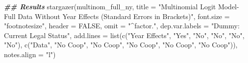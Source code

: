 \documentclass[a4paper,nobind]{templates/ociamthesis}
\newenvironment{Shaded}{\begin{snugshade}}{\end{snugshade}}
\newcommand{\AttributeTok}[1]{\textcolor[rgb]{0.77,0.63,0.00}{#1}}
\newcommand{\ConstantTok}[1]{\textcolor[rgb]{0.00,0.00,0.00}{#1}}
\newcommand{\DocumentationTok}[1]{\textcolor[rgb]{0.56,0.35,0.01}{\textbf{\textit{#1}}}}
\newcommand{\FunctionTok}[1]{\textcolor[rgb]{0.00,0.00,0.00}{#1}}
\newcommand{\NormalTok}[1]{#1}
\newcommand{\StringTok}[1]{\textcolor[rgb]{0.31,0.60,0.02}{#1}}
\renewenvironment{Shaded}
{
  \vspace{10pt}%
  \begin{snugshade}%
}{%
  \end{snugshade}%
  \vspace{8pt}%
}
\begin{document}
\begin{Shaded}
\begin{Highlighting}[]
\DocumentationTok{\#\# Results }
\FunctionTok{stargazer}\NormalTok{(multinom\_full\_ny, }\AttributeTok{title =} \StringTok{"Multinomial Logit Model{-} Full Data Without Year Effects (Standard Errors in Brackets)"}\NormalTok{, }\AttributeTok{font.size =} \StringTok{"footnotesize"}\NormalTok{, }\AttributeTok{header =} \ConstantTok{FALSE}\NormalTok{, }\AttributeTok{omit =} \StringTok{"\^{}factor."}\NormalTok{, }\AttributeTok{dep.var.labels =} \StringTok{"Dummy: Current Legal Status"}\NormalTok{, }\AttributeTok{add.lines =} \FunctionTok{list}\NormalTok{(}\FunctionTok{c}\NormalTok{(}\StringTok{"Year Effects"}\NormalTok{, }\StringTok{"Yes"}\NormalTok{, }\StringTok{"No"}\NormalTok{, }\StringTok{"No"}\NormalTok{, }\StringTok{"No"}\NormalTok{, }\StringTok{"No"}\NormalTok{), }\FunctionTok{c}\NormalTok{(}\StringTok{"Data"}\NormalTok{, }\StringTok{"No Coop"}\NormalTok{, }\StringTok{"No Coop"}\NormalTok{, }\StringTok{"No Coop"}\NormalTok{, }\StringTok{"No Coop"}\NormalTok{, }\StringTok{"No Coop"}\NormalTok{)), }\AttributeTok{notes.align =} \StringTok{"l"}\NormalTok{)}
\end{Highlighting}
\end{Shaded}
\end{document}
